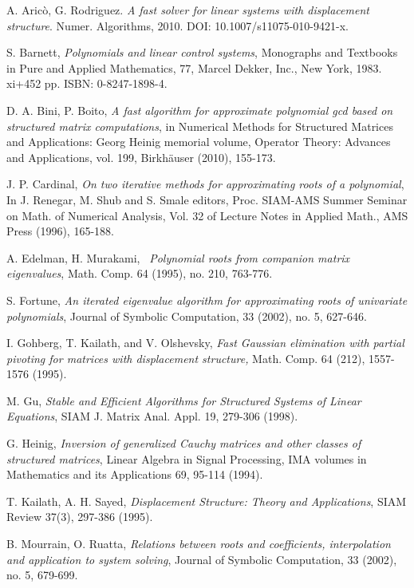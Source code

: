 \documentclass{article}
\newcommand{\tmem}[1]{{\em #1\/}}
\begin{document}
\begin{thebibliography}{}
  { A. Aric\`o, G. Rodriguez. {\tmem{A fast solver for linear
  systems with displacement structure}}. Numer. Algorithms, 2010. DOI:
  10.1007/s11075-010-9421-x.}
  
  { S. Barnett, {\tmem{Polynomials and linear control systems}},
  Monographs and Textbooks in Pure and Applied Mathematics, 77, Marcel Dekker,
  Inc., New York, 1983. xi+452 pp. ISBN: 0-8247-1898-4.}
  
  { D. A. Bini, P. Boito, {\tmem{A fast algorithm for approximate
  polynomial gcd based on structured matrix computations}}, in Numerical
  Methods for Structured Matrices and Applications: Georg Heinig memorial
  volume, Operator Theory: Advances and Applications, vol. 199, Birkh\"auser
  (2010), 155-173.}
  
  { J. P. Cardinal, {\tmem{On two iterative methods for
  approximating roots of a polynomial}}, In J. Renegar, M. Shub and S. Smale
  editors, Proc. SIAM-AMS Summer Seminar on Math. of Numerical Analysis, Vol.
  32 of Lecture Notes in Applied Math., AMS Press (1996), 165-188.}
  
  { A. Edelman, H. Murakami, \ {\tmem{Polynomial roots from
  companion matrix eigenvalues}}, Math. Comp. 64 (1995), no. 210, 763-776.}
  
  { S. Fortune, {\tmem{An iterated eigenvalue algorithm for
  approximating roots of univariate polynomials}}, Journal of Symbolic
  Computation, 33 (2002), no. 5, 627-646.}
  
  { I. Gohberg, T. Kailath, and V. Olshevsky, {\tmem{Fast
  Gaussian elimination with partial pivoting for matrices with displacement
  structure,}} Math. Comp. 64 (212), 1557-1576 (1995).}
  
  { M. Gu, {\tmem{Stable and Efficient Algorithms for Structured
  Systems of Linear Equations}}, SIAM J. Matrix Anal. Appl. 19, 279-306
  (1998).}
  
  { G. Heinig, {\tmem{Inversion of generalized Cauchy matrices
  and other classes of structured matrices}}, Linear Algebra in Signal
  Processing, IMA volumes in Mathematics and its Applications 69, 95-114
  (1994).}
  
  { T. Kailath, A. H. Sayed, {\tmem{Displacement Structure: Theory
  and Applications}}, SIAM Review 37(3), 297-386 (1995). }
  
  { B. Mourrain, O. Ruatta, {\tmem{Relations between roots and
  coefficients, interpolation and application to system solving}}, Journal of
  Symbolic Computation, 33 (2002), no. 5, 679-699.}
  

\end{thebibliography}
\end{document}
